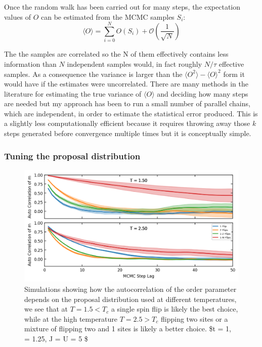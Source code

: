 Once the random walk has been carried out for many steps, the expectation values of \(O\) can be estimated from the MCMC samples \(S_i\): \[
    \langle O \rangle = \sum_{i = 0}^{N} O(S_i) + \mathcal{O}(\frac{1}{\sqrt{N}})
\]

The the samples are correlated so the N of them effectively contains less information than \(N\) independent samples would, in fact roughly \(N/\tau\) effective samples. As a consequence the variance is larger than the \(\langle O^2 \rangle - \langle O \rangle ^2\) form it would have if the estimates were uncorrelated. There are many methods in the literature for estimating the true variance of \(\langle O \rangle\) and deciding how many steps are needed but my approach has been to run a small number of parallel chains, which are independent, in order to estimate the statistical error produced. This is a slightly less computationally efficient because it requires throwing away those \(k\) steps generated before convergence multiple times but it is conceptually simple.

\hypertarget{tuning-the-proposal-distribution}{%
\subsubsection{Tuning the proposal distribution}\label{tuning-the-proposal-distribution}}

\hypertarget{fig:autocorr_multiple_proposals}{%
\begin{figure}
\centering
\includegraphics[width=1\textwidth,height=\textheight]{figure_code/fk_chapter/lsr/figs/autocorr_multiple_proposals.png}
\caption[{Comparison of different proposal distributions}]{Simulations showing how the autocorrelation of the order parameter depends on the proposal distribution used at different temperatures, we see that at \(T = 1.5 < T_c\) a single spin flip is likely the best choice, while at the high temperature \(T = 2.5 > T_c\) flipping two sites or a mixture of flipping two and 1 sites is likely a better choice. \$t = 1, \alpha = 1.25, J = U = 5 \$}
\label{fig:autocorr_multiple_proposals}
\end{figure}
}

